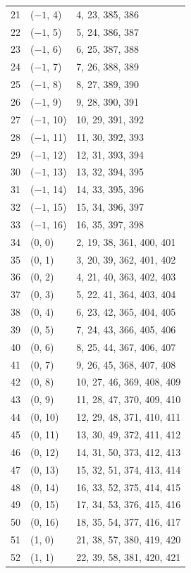 \documentclass{article}
\begin{document}
\begin{longtable}{lll}
  21 & (\(-1\), 4) & 4, 23, 385, 386 \\
  22 & (\(-1\), 5) & 5, 24, 386, 387 \\
  23 & (\(-1\), 6) & 6, 25, 387, 388 \\
  24 & (\(-1\), 7) & 7, 26, 388, 389 \\
  25 & (\(-1\), 8) & 8, 27, 389, 390 \\
  26 & (\(-1\), 9) & 9, 28, 390, 391 \\
  27 & (\(-1\), 10) & 10, 29, 391, 392 \\
  28 & (\(-1\), 11) & 11, 30, 392, 393 \\
  29 & (\(-1\), 12) & 12, 31, 393, 394 \\
  30 & (\(-1\), 13) & 13, 32, 394, 395 \\
  31 & (\(-1\), 14) & 14, 33, 395, 396 \\
  32 & (\(-1\), 15) & 15, 34, 396, 397 \\
  33 & (\(-1\), 16) & 16, 35, 397, 398 \\
  34 & (0, 0) & 2, 19, 38, 361, 400, 401 \\
  35 & (0, 1) & 3, 20, 39, 362, 401, 402 \\
  36 & (0, 2) & 4, 21, 40, 363, 402, 403 \\
  37 & (0, 3) & 5, 22, 41, 364, 403, 404 \\
  38 & (0, 4) & 6, 23, 42, 365, 404, 405 \\
  39 & (0, 5) & 7, 24, 43, 366, 405, 406 \\
  40 & (0, 6) & 8, 25, 44, 367, 406, 407 \\
  41 & (0, 7) & 9, 26, 45, 368, 407, 408 \\
  42 & (0, 8) & 10, 27, 46, 369, 408, 409 \\
  43 & (0, 9) & 11, 28, 47, 370, 409, 410 \\
  44 & (0, 10) & 12, 29, 48, 371, 410, 411 \\
  45 & (0, 11) & 13, 30, 49, 372, 411, 412 \\
  46 & (0, 12) & 14, 31, 50, 373, 412, 413 \\
  47 & (0, 13) & 15, 32, 51, 374, 413, 414 \\
  48 & (0, 14) & 16, 33, 52, 375, 414, 415 \\
  49 & (0, 15) & 17, 34, 53, 376, 415, 416 \\
  50 & (0, 16) & 18, 35, 54, 377, 416, 417 \\
  51 & (1, 0) & 21, 38, 57, 380, 419, 420 \\
  52 & (1, 1) & 22, 39, 58, 381, 420, 421 \\

\end{longtable}
\end{document}
